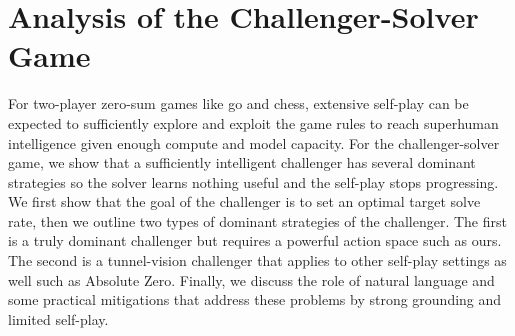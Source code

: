 \newcommand{\E}{\mathrm{E}}

\section{Analysis of the Challenger-Solver Game}
\label{sec:challengersolver}

For two-player zero-sum games like go and chess, extensive self-play can be expected to sufficiently explore and exploit the game rules to reach superhuman intelligence given enough compute and model capacity.
For the challenger-solver game, we show that a sufficiently intelligent challenger has several dominant strategies so the solver learns nothing useful and the self-play stops progressing. We first show that the goal of the challenger is to set an optimal target solve rate, then we outline two types of dominant strategies of the challenger. The first is a truly dominant challenger but requires a powerful action space such as ours. The second is a tunnel-vision challenger that applies to other self-play settings as well such as Absolute Zero. Finally, we discuss the role of natural language and some practical mitigations that address these problems by strong grounding and limited self-play.

